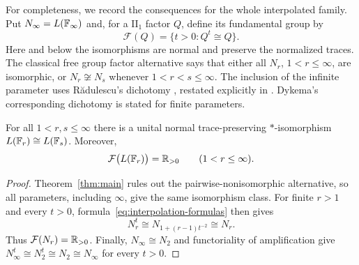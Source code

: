 For completeness, we record the consequences for the whole interpolated
family. Put $N_\infty=L(\mathbb F_\infty)$ and, for a $\mathrm{II}_1$ factor $Q$,
define its fundamental group by
\[
 \mathcal F(Q)=\{t>0:Q^t\cong Q\}.
\]
Here and below the isomorphisms are normal and preserve the normalized
traces. The classical free group factor alternative says that either
all $N_r$, $1<r\leq\infty$, are isomorphic, or $N_r\not\cong N_s$
whenever $1<r<s\leq\infty$. The inclusion of the infinite parameter
uses R\u adulescu's dichotomy \cite[Corollary~4.7]{radulescu1994},
restated explicitly in \cite[Theorem~1.1]{goldbring_pi2025}.
Dykema's corresponding dichotomy \cite[Corollary~4.2]{dykema1994}
is stated for finite parameters.

\begin{corollary}\label{cor:all-interpolated}
For all $1<r,s\leq\infty$ there is a unital normal trace-preserving
$*$-isomorphism $L(\mathbb F_r)\cong L(\mathbb F_s)$. Moreover,
\[
 \mathcal F\bigl(L(\mathbb F_r)\bigr)=\mathbb R_{>0}
 \qquad(1<r\leq\infty).
\]
\end{corollary}
\begin{proof}
Theorem~\ref{thm:main} rules out the pairwise-nonisomorphic alternative,
so all parameters, including $\infty$, give the same isomorphism class.
For finite $r>1$ and every $t>0$, formula~\eqref{eq:interpolation-formulas}
then gives
\[
 N_r^t\cong N_{1+(r-1)t^{-2}}\cong N_r.
\]
Thus $\mathcal F(N_r)=\mathbb R_{>0}$. Finally, $N_\infty\cong N_2$ and
functoriality of amplification give
$N_\infty^t\cong N_2^t\cong N_2\cong N_\infty$ for every $t>0$.
\end{proof}
